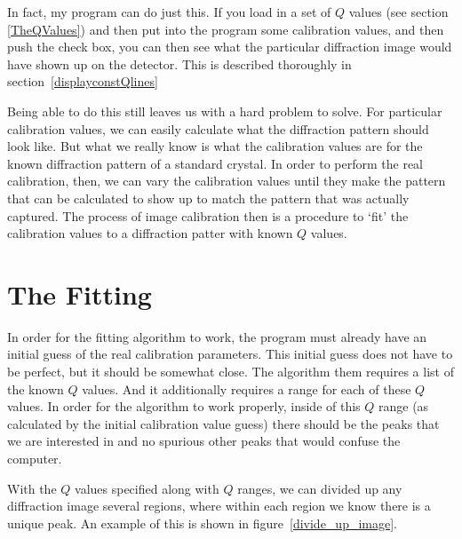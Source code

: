 In fact, my program can do just this. If you load in 
a set of $Q$ values (see section 
\ref{TheQValues})
and then put into the program some calibration values,
and then push the  check box, 
you can then see what the particular diffraction
image would have shown up on the detector. 
This is described thoroughly in 
section~\ref{displayconstQlines}

Being able to do this still leaves us with a hard 
problem to solve. For particular calibration values,
we can easily calculate what the diffraction pattern 
should look like. But what we really know is what
the calibration values are for the known diffraction
pattern of a standard crystal. In order to perform the
real calibration, then, we can vary the calibration 
values until they make the pattern that can be calculated
to show up to match the pattern that was actually 
captured. The process of image calibration then is a 
procedure to `fit' the calibration values to a
diffraction patter with known $Q$ values.

\section{The Fitting} 
\label{fitting_sec}

In order for the fitting algorithm to work, the program 
must already have an initial guess of the real calibration 
parameters. This initial guess does not have to be perfect, 
but it should be somewhat close. The algorithm them requires 
a list of the known $Q$ values. And it additionally requires 
a range for each of these $Q$ values. In order for the 
algorithm to work properly, inside of this $Q$ range (as 
calculated by the initial calibration value guess) there 
should be the peaks that we are interested in and no spurious 
other peaks that would confuse the computer.

With the $Q$ values specified along with $Q$ ranges, we can
divided up any diffraction image several regions, where
within each region we know there is a unique peak.
An example of this is shown in figure~\ref{divide_up_image}.

